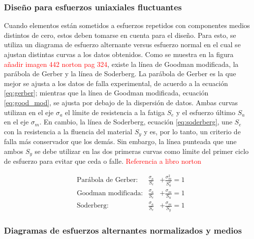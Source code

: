 \subsubsection{Diseño para esfuerzos uniaxiales fluctuantes}
Cuando elementos están sometidos a esfuerzos repetidos con componentes medios distintos de cero, estos deben tomarse en cuenta para el diseño. Para esto, se utiliza un diagrama de esfuerzo alternante versus esfuerzo normal en el cual se ajustan distintas curvas a los datos obtenidos. Como se muestra en la figura \textcolor{red}{añadir imagen 442 norton pag 324}, existe la línea de Goodman modificada, la parábola de Gerber y la línea de Soderberg. La parábola de Gerber es la que mejor se ajusta a los datos de falla experimental, de acuerdo a la ecuación \ref{eq:gerber}; mientras que la línea de Goodman modificada, ecuación \ref{eq:good_mod}, se ajusta por debajo de la dispersión de datos. Ambas curvas utilizan en el eje $\sigma_a$ el límite de resistencia a la fatiga $S_e$ y el esfuerzo último $S_u$ en el eje $\sigma_m$. En cambio, la línea de Soderberg, ecuación \ref{eq:soderberg}, une $S_e$ con la resistencia a la fluencia del material $S_y$ y es, por lo tanto, un criterio de falla más conservador que los demás. Sin embargo, la línea punteada que une ambos $S_y$ se debe utilizar en las dos primeras curvas como límite del primer ciclo de esfuerzo para evitar que ceda o falle. \textcolor{red}{Referencia a libro norton}

\begin{centering}
\begin{align}
&\text{Parábola de Gerber:}&	\frac{\sigma_a}{S_e} &+ \frac{\sigma_m^2}{S_u^2} = 1 \label{eq:gerber}\\
&\text{Goodman modificada:}&	\frac{\sigma_a}{S_e} &+ \frac{\sigma_m}{S_u} = 1 \label{eq:good_mod}\\
&\text{Soderberg:}&	\frac{\sigma_a}{S_e} &+ \frac{\sigma_m}{S_y} = 1 \label{eq:soderberg}
\end{align}
\end{centering}


\subsubsection{Diagramas de esfuerzos alternantes normalizados y medios}

